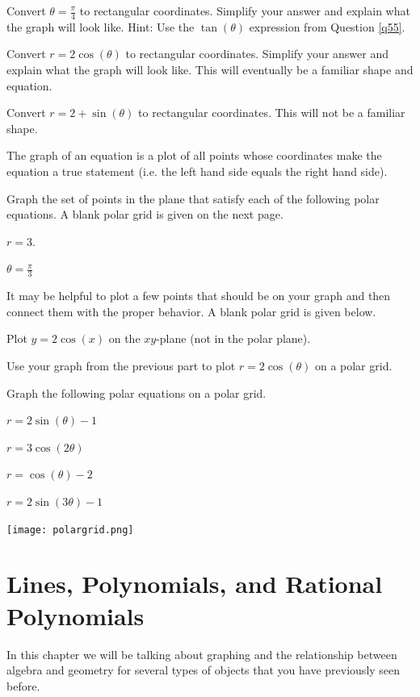 \bq Convert $\theta=\frac{\pi}{4}$ to rectangular coordinates. Simplify your answer and explain what the graph will look like. Hint: Use the $\tan(\theta)$ expression from Question \ref{q55}.
\eq

\bq Convert $r=2 \cos(\theta)$ to rectangular coordinates. Simplify your answer and explain what the graph will look like. This will eventually be a familiar shape and equation.
\eq

\bq Convert $r=2+\sin(\theta)$ to rectangular coordinates. This will not be a familiar shape.
\eq

\begin{info} The graph of an equation is a plot of all points whose coordinates make the equation a true statement (i.e. the left hand side equals the right hand side).

\end{info}

\bq Graph the set of points in the plane that satisfy each of the following polar equations.
A blank polar grid  is given on the next page. \be
\item $r=3$.
\item $\theta=\frac{\pi}{3}$
\ee \eq

\bq It may be helpful to plot a few points that should be on your graph and then connect them with the proper behavior. A blank polar grid is given below.
\be
\item Plot $y=2\cos(x)$ on the $xy$-plane (not in the polar plane).
\item Use your graph from the previous part to plot $r=2\cos(\theta)$ on a polar grid.
\ee
\eq

\bq Graph the following  polar equations on a polar grid.
\be
\item $r=2\sin(\theta)-1$
\item $r=3\cos(2\theta)$
\item $r=\cos(\theta)-2$
\item $r=2\sin(3 \theta)-1$
\ee
\eq

\begin{center} \texttt{[image: polargrid.png]} \end{center}


\chapter{Lines, Polynomials, and Rational Polynomials}
In this chapter we will be talking about graphing and the relationship between algebra and geometry for several types of objects that you have previously seen before.
